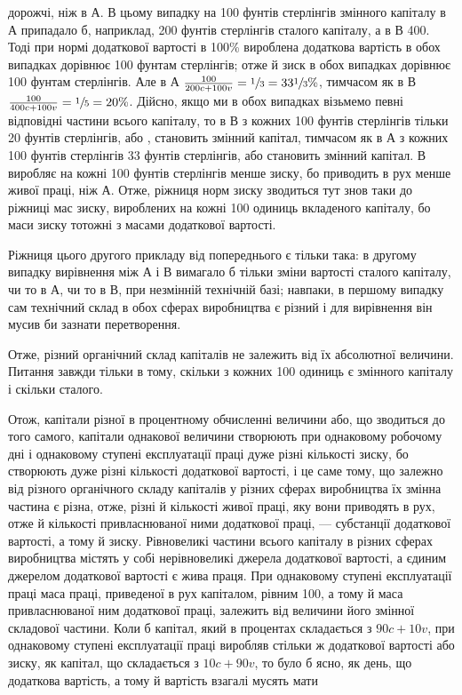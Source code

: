 \parcont{}  %
дорожчі, ніж в $А$. В цьому випадку на 100 фунтів стерлінгів
змінного капіталу в $А$ припадало б, наприклад, 200 фунтів
стерлінгів сталого капіталу, а в $В$ 400. Тоді при нормі додаткової вартості в 100\% вироблена
додаткова вартість в обох випадках дорівнює 100 фунтам стерлінгів; отже й зиск в обох випадках
дорівнює 100 фунтам стерлінгів. Але в $А$ $\frac{100}{200 c + 100 v} =
\sfrac{1}{3} = 33\sfrac{1}{3}\%$, тимчасом як в $В$ $\frac{100}{400 c + 100 v }= \sfrac{1}{5}=20\%$. Дійсно,
якщо ми в обох випадках візьмемо певні відповідні частини
всього капіталу, то в $В$ з кожних 100 фунтів стерлінгів тільки
20 фунтів стерлінгів, або , становить змінний капітал, тимчасом як в $А$ з кожних 100 фунтів
стерлінгів 33 фунтів стерлінгів, або  становить змінний капітал. $В$ виробляє на кожні 100
фунтів стерлінгів менше зиску, бо приводить в рух менше
живої праці, ніж $А$. Отже, ріжниця норм зиску зводиться тут
знов таки до ріжниці мас зиску, вироблених на кожні 100 одиниць вкладеного капіталу, бо маси зиску
тотожні з масами додаткової вартості.

Ріжниця цього другого прикладу від попереднього є тільки
така: в другому випадку вирівнення між $А$ і $В$ вимагало б тільки
зміни вартості сталого капіталу, чи то в $А$, чи то в $В$, при незмінній технічній базі; навпаки, в
першому випадку сам технічний склад в обох сферах виробництва є різний і для вирівнення він мусив би
зазнати перетворення.

Отже, різний органічний склад капіталів не залежить від їх
абсолютної величини. Питання завжди тільки в тому, скільки
з кожних 100 одиниць є змінного капіталу і скільки сталого.

Отож, капітали різної в процентному обчисленні величини
або, що зводиться до того самого, капітали однакової величини
створюють при однаковому робочому дні і однаковому ступені
експлуатації праці дуже різні кількості зиску, бо створюють
дуже різні кількості додаткової вартості, і це саме тому, що
залежно від різного органічного складу капіталів у різних сферах виробництва їх змінна частина є
різна, отже, різні й кількості живої праці, яку вони приводять в рух, отже й кількості
привласнюваної ними додаткової праці, — субстанції додаткової
вартості, а тому й зиску. Рівновеликі частини всього капіталу
в різних сферах виробництва містять у собі нерівновеликі джерела додаткової вартості, а єдиним
джерелом додаткової вартості є жива праця. При однаковому ступені експлуатації праці маса праці,
приведеної в рух капіталом, рівним 100, а тому й
маса привласнюваної ним додаткової праці, залежить від величини
його змінної складової частини. Коли б капітал, який в процентах складається з $90 c + 10 v$, при
однаковому ступені експлуатації праці виробляв стільки ж додаткової вартості або зиску, як капітал,
що складається з $10 c + 90 v$, то було б ясно, як день,
що додаткова вартість, а тому й вартість взагалі мусять мати
\parbreak{}  %
